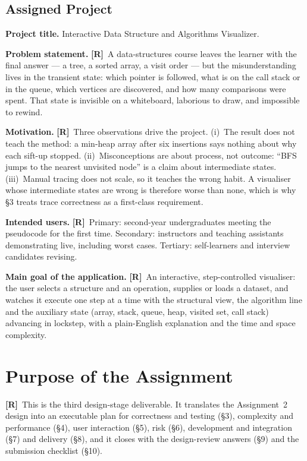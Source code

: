 \documentclass[11pt,a4paper]{article}
\newcommand{\R}{\textcolor{reqc}{\textbf{[R]}}}     %
\begin{document}
\subsection{Assigned Project}

\noindent\textbf{Project title.} Interactive Data Structure and Algorithms Visualizer.

\medskip
\noindent\textbf{Problem statement.} \R\ A data-structures course leaves the learner with the
final answer --- a tree, a sorted array, a visit order --- but the misunderstanding lives in
the transient state: which pointer is followed, what is on the call stack or in the queue,
which vertices are discovered, and how many comparisons were spent. That state is invisible
on a whiteboard, laborious to draw, and impossible to rewind.

\medskip
\noindent\textbf{Motivation.} \R\ Three observations drive the project. (i)~The result does
not teach the method: a min-heap array after six insertions says nothing about why each
sift-up stopped. (ii)~Misconceptions are about process, not outcome: ``BFS jumps to the
nearest unvisited node'' is a claim about intermediate states. (iii)~Manual tracing does not
scale, so it teaches the wrong habit. A visualiser whose intermediate states are wrong is
therefore worse than none, which is why \S3 treats trace correctness as a first-class
requirement.

\medskip
\noindent\textbf{Intended users.} \R\ Primary: second-year undergraduates meeting the
pseudocode for the first time. Secondary: instructors and teaching assistants demonstrating
live, including worst cases. Tertiary: self-learners and interview candidates revising.

\medskip
\noindent\textbf{Main goal of the application.} \R\ An interactive, step-controlled
visualiser: the user selects a structure and an operation, supplies or loads a dataset, and
watches it execute one step at a time with the structural view, the algorithm line and the
auxiliary state (array, stack, queue, heap, visited set, call stack) advancing in lockstep,
with a plain-English explanation and the time and space complexity.

\section{Purpose of the Assignment}

\R\ This is the third design-stage deliverable. It translates the Assignment~2 design into an
executable plan for correctness and testing (\S3), complexity and performance (\S4), user
interaction (\S5), risk (\S6), development and integration (\S7) and delivery (\S8), and it
closes with the design-review answers (\S9) and the submission checklist (\S10).
\end{document}
